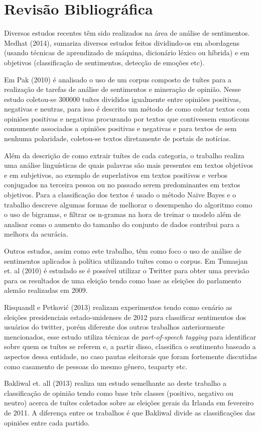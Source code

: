\chapter{Revisão Bibliográfica}

Diversos estudos recentes têm sido realizados na área de análise de sentimentos.
Medhat (2014)\citep{medhat2014}, sumariza diversos estudos feitos dividindo-os em
abordagens (usando técnicas de aprendizado de máquina, dicionário léxico ou
híbrida) e em objetivos (classificação de sentimentos, detecção de emoções etc).

Em Pak (2010)\citep{pak2010} é analisado o uso de um corpus composto de tuítes para
a realização de tarefas de análise de sentimentos e mineração de opinião. Nesse estudo
coletou-se 300000 tuítes divididos igualmente entre opiniões positivas, negativas e neutras, para
isso é descrito um método de como coletar textos com opiniões positivas e negativas procurando
por textos que contivessem emoticons comumente associados a opiniões positivas e negativas e para
textos de sem nenhuma polaridade, coletou-se textos diretamente de portais de notícias.

Além da descrição de como extrair tuítes de cada categoria, o trabalho realiza uma análise linguísticas
de quais palavras são mais presentes em textos objetivos e em subjetivos, ao exemplo de 
superlativos em textos positivos e verbos conjugados na terceira pessoa ou no passado serem 
predominantes em textos objetivos. Para a classificação dos textos é usado o método Naive Bayes e
o trabalho descreve algumas formas de melhorar o desempenho do algoritmo como o uso de bigramas,
e filtrar os n-gramas na hora de treinar o modelo além de analisar como o aumento do tamanho do 
conjunto de dados contribui para a melhora da acurácia. 

Outros estudos, assim como este trabalho, têm como foco o uso de análise de sentimentos
aplicados à política utilizando tuítes como o corpus. Em Tumasjan et. al (2010)\citep{tumasjan2010} é estudado
se é possível utilizar o Twitter para obter uma previsão para os resultados de uma eleição
tendo como base as eleições do parlamento alemão realizadas em 2009.

Risquandl e Petković (2013)\citep{petkovic2013} realizam experimentos tendo como cenário as
eleições presidenciais estado-unidenses de 2012 para classificar sentimentos dos usuários do
twitter, porém diferente dos outros trabalhos anteriormente mencionados, esse estudo utiliza
técnicas de \textit{part-of-speech tagging} para identificar sobre quem os tuítes se referem e, a
partir disso, classifica o sentimento baseado a aspectos dessa entidade, no caso pautas eleitorais
que foram fortemente discutidas como casamento de pessoas do mesmo gênero, teaparty etc.

Bakliwal et. all (2013)\citep{bakliwal2013} realiza um estudo semelhante ao deste trabalho a classificação de opinião
tendo como base três classes (positivo, negativo ou neutro) acerca de tuítes coletados sobre
as eleições gerais da Irlanda em fevereiro de 2011. A diferença entre os trabalhos é que Bakliwal
divide as classificações das opiniões entre cada partido.


